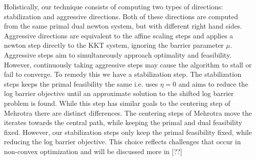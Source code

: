\documentclass{article}
\begin{document}
Holistically, our technique consists of computing two types of directions: stabilization and aggressive directions. Both of these directions are computed from the same primal dual newton system, but with different right hand sides. Aggressive directions are equivalent to the affine scaling steps \cite{mehrotra1992implementation} and applies a newton step directly to the KKT system, ignoring the barrier parameter $\mu$. Aggressive steps aim to simultaneously approach optimality and feasibility. However, continuously taking aggressive steps may cause the algorithm to stall or fail to converge. To remedy this we have a stabilization step. The stabilization steps keeps the primal feasibility the same i.e. uses $\eta = 0$ and aims to reduce the log barrier objective until an approximate solution to the shifted log barrier problem is found. While this step has similar goals to the centering step of Mehrotra there are distinct differences. The centering steps of Mehrotra move the iterates towards the central path, while keeping the primal and dual feasibility fixed. However, our stabilization steps only keep the primal feasibility fixed, while reducing the log barrier objective. This choice reflects challenges that occur in non-convex optimization and will be discussed more in [??]
\end{document}
